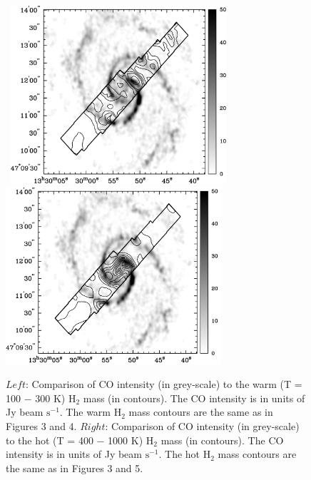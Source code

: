 \documentclass[manuscript]{aastex}
\begin{document}
\clearpage


\begin{figure}[!h]
\centerline{\hbox{\hspace{0.0in}
\includegraphics[width=8cm,angle=0]{bw_co_v_warm.jpg}
\hspace{0.1in}
\includegraphics[width=8cm,angle=0]{new_bw_co_v_hot.jpg}}}
\caption{$Left$: Comparison of  CO intensity (in grey-scale) to the warm (T = 100 $-$ 300 K) $\mathrm{H_2}$ mass (in contours).  The CO intensity is in units of Jy beam $\mathrm{s^{-1}}$. The warm $\mathrm{H_2}$ mass contours are the same as in Figures 3 and 4.  $Right$: Comparison of CO intensity (in grey-scale) to the hot (T = 400 $-$ 1000 K) $\mathrm{H_2}$ mass (in contours).  The CO intensity is in units of Jy beam $\mathrm{s^{-1}}$. The hot $\mathrm{H_2}$ mass contours are the same as in Figures 3 and 5.
\label{fig7}}
\end{figure}

\clearpage
\end{document}
